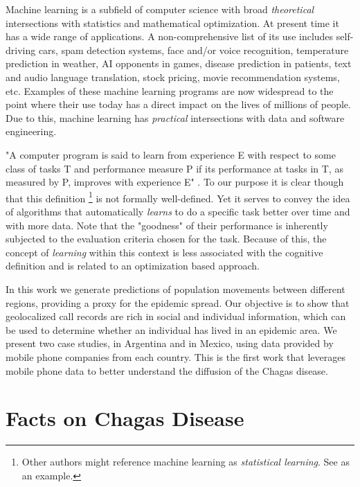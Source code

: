 Machine learning is a subfield of computer science with broad \textit{theoretical} intersections with statistics and mathematical optimization. At present time it has a wide range of applications. A non-comprehensive list of its use includes self-driving cars, spam detection systems, face and/or voice recognition, temperature prediction in weather, AI opponents in games, disease prediction in patients, text and audio language translation, stock pricing, movie recommendation systems, etc. Examples of these machine learning programs are now widespread to the point where their use today has a direct impact on the lives of millions of people. Due to this, machine learning has \textit{practical} intersections with data and software engineering.

"A computer program is said to learn from experience E with respect to some class of tasks T and performance measure P if its performance at tasks in T, as measured by P, improves with experience E" \textcite{Mitchell-MLearning}. To our purpose it is clear though that this definition \footnote{Other authors might reference machine learning as \textit{statistical learning}. See \textcite{hastie-elemstatslearn} as an example.} is not formally well-defined. Yet it serves to convey the idea of algorithms that automatically \textit{learns} to do a specific task better over time and with more data. Note that the "goodness" of their performance is inherently subjected to the evaluation criteria chosen for the task. Because of this, the concept of \textit{learning} within this context is less associated with the cognitive definition and is related to an optimization based approach.

 In this work we generate predictions of population movements between different regions, providing a proxy for the epidemic spread. Our objective is to show that geolocalized call records are rich in social and individual information, which can be used to determine whether an individual has lived in an epidemic area. We present two case studies, in Argentina and in Mexico, using data provided by mobile phone companies from each country. %
This is the first work that leverages mobile phone data to better understand the diffusion of the Chagas disease.




\section{Facts on Chagas Disease}

